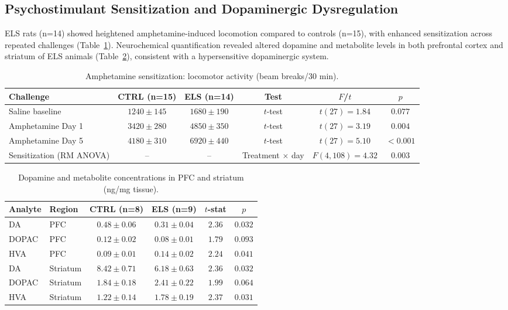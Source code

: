 \documentclass[11pt]{article}
\begin{document}
\subsection{Psychostimulant Sensitization and Dopaminergic Dysregulation}

ELS rats (n=14) showed heightened amphetamine-induced locomotion compared to controls (n=15), with enhanced sensitization across repeated challenges (Table~\ref{tab:amph}). Neurochemical quantification revealed altered dopamine and metabolite levels in both prefrontal cortex and striatum of ELS animals (Table~\ref{tab:neurochemistry}), consistent with a hypersensitive dopaminergic system.

\begin{table}[H]
\centering
\caption{Amphetamine sensitization: locomotor activity (beam breaks/30 min).}
\label{tab:amph}
\begin{tabular}{lccccc}
\toprule
\textbf{Challenge} & \textbf{CTRL (n=15)} & \textbf{ELS (n=14)} & \textbf{Test} & \textbf{$F$/$t$} & \textbf{$p$} \\
\midrule
Saline baseline & $1240 \pm 145$ & $1680 \pm 190$ & $t$-test & $t(27)=1.84$ & $0.077$ \\
Amphetamine Day 1 & $3420 \pm 280$ & $4850 \pm 350$ & $t$-test & $t(27)=3.19$ & $0.004$ \\
Amphetamine Day 5 & $4180 \pm 310$ & $6920 \pm 440$ & $t$-test & $t(27)=5.10$ & $<0.001$ \\
Sensitization (RM ANOVA) & -- & -- & Treatment $\times$ day & $F(4,108)=4.32$ & $0.003$ \\
\bottomrule
\end{tabular}
\end{table}

\begin{table}[H]
\centering
\caption{Dopamine and metabolite concentrations in PFC and striatum (ng/mg tissue).}
\label{tab:neurochemistry}
\begin{tabular}{llcccc}
\toprule
\textbf{Analyte} & \textbf{Region} & \textbf{CTRL (n=8)} & \textbf{ELS (n=9)} & \textbf{$t$-stat} & \textbf{$p$} \\
\midrule
DA & PFC & $0.48 \pm 0.06$ & $0.31 \pm 0.04$ & $2.36$ & $0.032$ \\
DOPAC & PFC & $0.12 \pm 0.02$ & $0.08 \pm 0.01$ & $1.79$ & $0.093$ \\
HVA & PFC & $0.09 \pm 0.01$ & $0.14 \pm 0.02$ & $2.24$ & $0.041$ \\
DA & Striatum & $8.42 \pm 0.71$ & $6.18 \pm 0.63$ & $2.36$ & $0.032$ \\
DOPAC & Striatum & $1.84 \pm 0.18$ & $2.41 \pm 0.22$ & $1.99$ & $0.064$ \\
HVA & Striatum & $1.22 \pm 0.14$ & $1.78 \pm 0.19$ & $2.37$ & $0.031$ \\
\bottomrule
\end{tabular}
\end{table}
\end{document}
